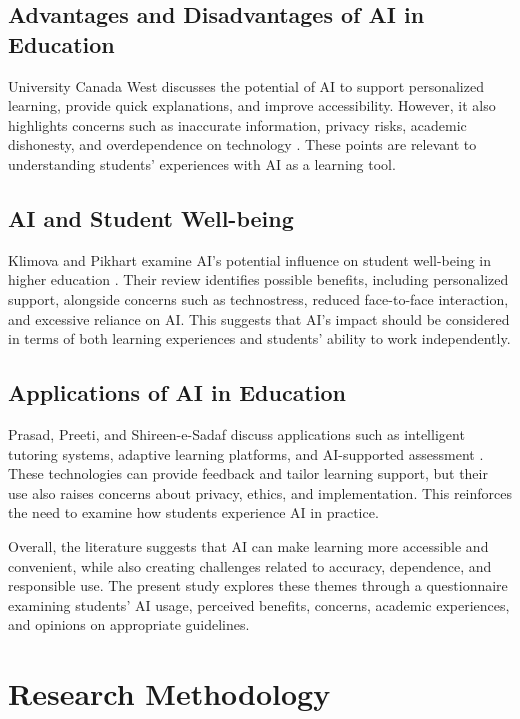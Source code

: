 \documentclass[12pt,a4paper]{article}
\begin{document}
\subsection{Advantages and Disadvantages of AI in Education}

University Canada West discusses the potential of AI to support personalized learning, provide quick explanations, and improve accessibility. However, it also highlights concerns such as inaccurate information, privacy risks, academic dishonesty, and overdependence on technology \cite{ucw}. These points are relevant to understanding students' experiences with AI as a learning tool.

\subsection{AI and Student Well-being}

Klimova and Pikhart examine AI's potential influence on student well-being in higher education \cite{klimova}. Their review identifies possible benefits, including personalized support, alongside concerns such as technostress, reduced face-to-face interaction, and excessive reliance on AI. This suggests that AI's impact should be considered in terms of both learning experiences and students' ability to work independently.

\subsection{Applications of AI in Education}

Prasad, Preeti, and Shireen-e-Sadaf discuss applications such as intelligent tutoring systems, adaptive learning platforms, and AI-supported assessment \cite{ijsret}. These technologies can provide feedback and tailor learning support, but their use also raises concerns about privacy, ethics, and implementation. This reinforces the need to examine how students experience AI in practice.

Overall, the literature suggests that AI can make learning more accessible and convenient, while also creating challenges related to accuracy, dependence, and responsible use. The present study explores these themes through a questionnaire examining students' AI usage, perceived benefits, concerns, academic experiences, and opinions on appropriate guidelines.

\section{Research Methodology}
\end{document}
